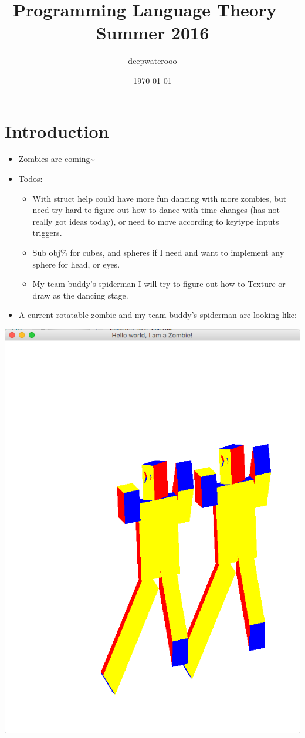 \documentclass[9pt,b5paper]{article}
\author{deepwaterooo}
\date{\today}
\title{Programming Language Theory -- Summer 2016}
\begin{document}
\maketitle
\tableofcontents


\section{Introduction}
\label{sec-1}
\begin{itemize}
\item Zombies are coming\textasciitilde{}
\item Todos: 
\begin{itemize}
\item With struct help could have more fun dancing with more zombies, but need try hard to figure out how to dance with time changes (has not really got ideas today), or need to move according to keytype inputs triggers.
\item Sub obj\% for cubes, and spheres if I need and want to implement any sphere for head, or eyes.
\item My team buddy's spiderman I will try to figure out how to Texture or draw as the dancing stage.
\end{itemize}
\item A current rotatable zombie and my team buddy's spiderman are looking like:
\end{itemize}

\includegraphics[width=.9\linewidth]{./pic/Screen_Shot_2016-05-27_at_6_04_21_PM.png}
\end{document}
